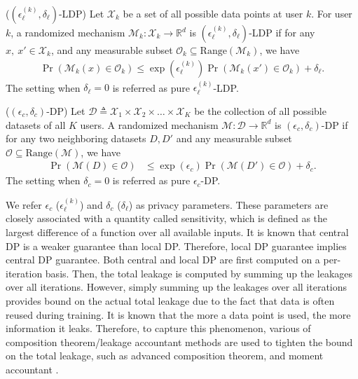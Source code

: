 \begin{definition} 
($(\epsilon_{\ell}^{(k)}, \delta_{\ell})$-LDP) Let $\mathcal{X}_k$ be a set of all possible data points at user $k$. For user $k$, a randomized mechanism $\mathcal{M}_k: \mathcal{X}_{k} \rightarrow \mathds{R}^{d}$ is $(\epsilon_{\ell}^{(k)}, \delta_{\ell})$-LDP if for any $x,~x' \in \mathcal{X}_k$, and any measurable subset $\mathcal{O}_k \subseteq \text{Range}(\mathcal{M}_k)$, we have
\begin{align}
    \operatorname{Pr}(\mathcal{M}_k(x) \in \mathcal{O}_k) \leq \exp{(\epsilon_{\ell}^{(k)})}  \operatorname{Pr}(\mathcal{M}_k(x') \in \mathcal{O}_k) + \delta_{\ell}.
\end{align}
The setting when $\delta_{\ell} = 0$ is referred as pure $\epsilon_{\ell}^{(k)}$-LDP.
\end{definition}

\begin{definition} 
($(\epsilon_{c}, \delta_{c})$-DP) Let $\mathcal{D}\triangleq \mathcal{X}_1 \times\mathcal{X}_2\times\dots\times\mathcal{X}_K$ be the collection of all possible datasets of all $K$ users. A randomized mechanism $\mathcal{M}: \mathcal{D} \rightarrow \mathds{R}^{d}$ is $(\epsilon_{c}, \delta_{c})$-DP if for any two neighboring datasets $D, D'$ and any measurable subset $\mathcal{O} \subseteq \text{Range}(\mathcal{M})$, we have
\begin{align}
    \operatorname{Pr}(\mathcal{M}(D) \in \mathcal{O}) &\leq \exp{(\epsilon_{c})}  \operatorname{Pr}(\mathcal{M}(D')  \in \mathcal{O}) + \delta_{c}. 
\end{align}
The setting when $\delta_{c} = 0$ is referred as pure $\epsilon_{c}$-DP. 
\end{definition}

We refer $\epsilon_c$ ($\epsilon_{\ell}^{(k)}$) and $\delta_c$ ($\delta_{\ell}$) as privacy parameters. These parameters are closely associated with a quantity called sensitivity, which is defined as the largest difference of a function over all available inputs. It is known that central DP is a weaker guarantee than local DP. Therefore, local DP guarantee implies central DP guarantee. Both central and local DP are first computed on a per-iteration basis. Then, the total leakage is computed by summing up the leakages over all iterations. However, simply summing up the leakages over all iterations provides bound on the actual total leakage due to the fact that data is often reused during training. It is known that the more a data point is used, the more information it leaks. Therefore, to capture this phenomenon, various of composition theorem/leakage accountant methods are used to tighten the bound on the total leakage, such as advanced composition theorem, and moment accountant \cite{Abadi2016}. 

